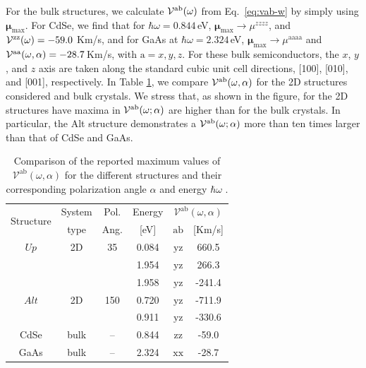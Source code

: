\documentclass[floatfix,prb,aps,superscriptaddress,showpacs,11pt,preprint,letterpaper]{revtex4}
\begin{document}
For the bulk structures, we calculate ${\cal V}^{\mathrm{a}\mathrm{b}}(\omega)$
from Eq.~\eqref{eq:vab-w} by simply using $\boldsymbol{\mu}_{\mathrm{max}}$.
For CdSe, we find that for $\hbar\omega=0.844$\,eV,
$\boldsymbol{\mu}_{\mathrm{max}}\to \mu^{zzzz}$, and ${\cal
V}^{\mathrm{z}\mathrm{z}}(\omega)=-59.0$ Km/s, and for GaAs at
$\hbar\omega=2.324$\,eV,
$\boldsymbol{\mu}_{\mathrm{max}}\to\mu^{\mathrm{aaaa}}$ and ${\cal
V}^{\mathrm{a}\mathrm{a}}(\omega,\alpha)=-28.7$\,Km/s, with $\mathrm{a}=x,y,z$.
For these bulk semiconductors, the $x$, $y$, and $z$ axis are taken along the
standard cubic unit cell directions, [100], [010], and [001], respectively. In
Table \ref{tab:vab-str-comp}, we compare ${\cal
V}^{\mathrm{a}\mathrm{b}}(\omega,\alpha)$ for the 2D structures considered and
bulk crystals. We stress that, as shown in the figure, for the 2D structures
have maxima in ${\cal V}^{\mathrm{a}\mathrm{b}}(\omega;\alpha)$ are higher than
for the bulk crystals. In particular, the Alt structure demonstrates a ${\cal
V}^{\mathrm{a}\mathrm{b}}(\omega;\alpha)$ more than ten times larger than that
of CdSe and GaAs.
\begin{table}%
\begin{tabular}{cccccc}
\hline
\multirow{2}{*}{Structure \quad} & 
System \quad & 
Pol. &
Energy & 
\multicolumn{2}{c}{$\mathcal{V}^{\mathrm{ab}}(\omega,\alpha)$}\\
\cline{5-6}
& type & Ang. & [eV] & $\mathrm{ab}$ \quad & [Km/s]\\
\hline
$Up$  & 2D   & 35    & 0.084  & $\mathrm{yz}$ &  660.5 \\
      &      &       & 1.954  & $\mathrm{yz}$ &  266.3 \\
      &      &       & 1.958  & $\mathrm{yz}$ & -241.4 \\
$Alt$ & 2D   & 150   & 0.720  & $\mathrm{yz}$ & -711.9 \\
      &      &       & 0.911  & $\mathrm{yz}$ & -330.6 \\
CdSe  & bulk & --    & 0.844  & $\mathrm{zz}$ &  -59.0 \\
GaAs  & bulk & --    & 2.324  & $\mathrm{xx}$ &  -28.7 \\
\hline
\end{tabular}
\caption{Comparison of the reported maximum values of
$\mathcal{V}^{\mathrm{ab}}(\omega,\alpha)$ for the different structures and
their corresponding polarization angle $\alpha$ and energy $\hbar\omega$ . }
\label{tab:vab-str-comp}
\end{table}
\end{document}
